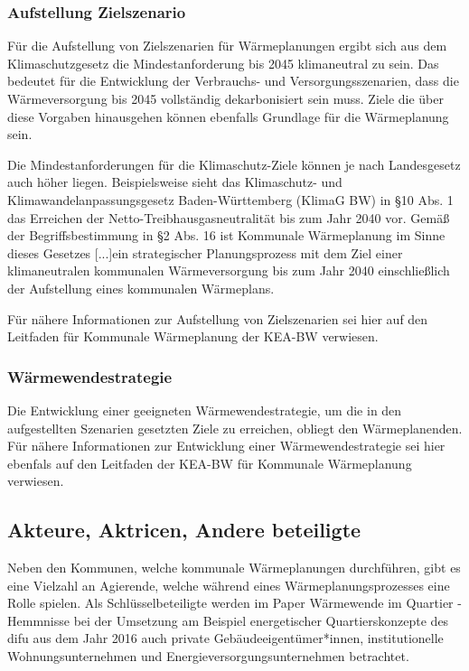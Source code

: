 			\subsubsection{Aufstellung Zielszenario}
				
				Für die Aufstellung von Zielszenarien für Wärmeplanungen ergibt sich aus dem Klimaschutzgesetz die Mindestanforderung bis 2045 klimaneutral zu sein. Das bedeutet für die Entwicklung der Verbrauchs- und Versorgungsszenarien, dass die Wärmeversorgung bis 2045 vollständig dekarbonisiert sein muss. Ziele die über diese Vorgaben hinausgehen können ebenfalls Grundlage für die Wärmeplanung sein. \cite{web_gesetze_ksg} \cite{kea_bw_leitfaden_waermeplanung}
				
				Die Mindestanforderungen für die Klimaschutz-Ziele können je nach Landesgesetz auch höher liegen. Beispielsweise sieht das Klimaschutz- und Klimawandelanpassungsgesetz Baden-Württemberg
				(KlimaG BW) in §10 Abs. 1 das Erreichen der Netto-Treibhausgasneutralität bis zum Jahr 2040 vor. Gemäß der Begriffsbestimmung in §2 Abs. 16 ist \frqq Kommunale Wärmeplanung im Sinne dieses Gesetzes [...]ein strategischer Planungsprozess mit dem Ziel einer klimaneutralen kommunalen Wärmeversorgung bis zum Jahr 2040 einschließlich der Aufstellung eines kommunalen Wärmeplans.\flqq \cite{web_gesetze_klimag_bw}
				
				Für nähere Informationen zur Aufstellung von Zielszenarien sei hier auf den Leitfaden für Kommunale Wärmeplanung der KEA-BW verwiesen. \cite{kea_bw_leitfaden_waermeplanung}
				
			\subsubsection{Wärmewendestrategie}
			
				Die Entwicklung einer geeigneten Wärmewendestrategie, um die in den aufgestellten Szenarien gesetzten Ziele zu erreichen, obliegt den Wärmeplanenden. Für nähere Informationen zur Entwicklung einer Wärmewendestrategie sei hier ebenfals auf den Leitfaden der KEA-BW für Kommunale Wärmeplanung verwiesen. \cite{kea_bw_leitfaden_waermeplanung}
			
		\subsection{Akteure, Aktricen, Andere beteiligte}
		
			Neben den Kommunen, welche kommunale Wärmeplanungen durchführen, gibt es eine Vielzahl an Agierende, welche während eines Wärmeplanungsprozesses eine Rolle spielen. Als Schlüsselbeteiligte werden im Paper Wärmewende im Quartier - Hemmnisse bei der Umsetzung am Beispiel energetischer Quartierskonzepte des difu aus dem Jahr 2016 auch private Gebäudeeigentümer*innen, institutionelle Wohnungsunternehmen und Energieversorgungsunternehmen betrachtet. \cite{difu_2016_waermewende_im_quartier_hemmnisse}
						
